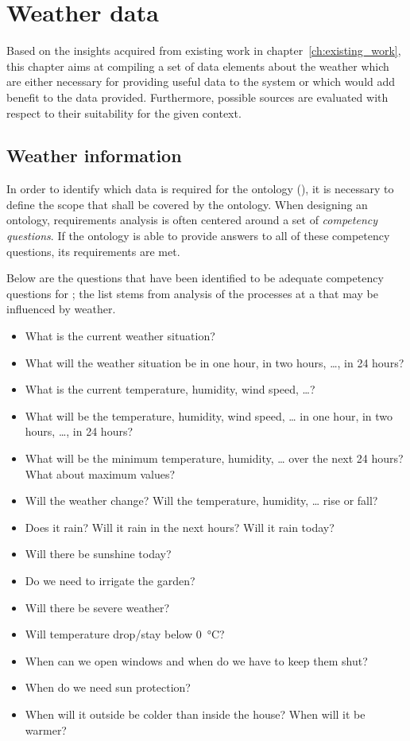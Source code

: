 \chapter{Weather data}
\label{ch:weather_data}

Based on the insights acquired from existing work in chapter~\ref{ch:existing_work}, this chapter aims at compiling a set of data elements about the weather which are either necessary for providing useful data to the \thinkhome system or which would add benefit to the data provided. Furthermore, possible sources are evaluated with respect to their suitability for the given context.

\section{Weather information}
\label{sec:weather_information}

In order to identify which data is required for the \thinkhome ontology (\thinkhomeweather), it is necessary to define the scope that shall be covered by the ontology. When designing an ontology, requirements analysis is often centered around a set of \emph{competency questions}\cite{Ontology101,UscholdKing,GruningerFox,Methontology}. If the ontology is able to provide answers to all of these competency questions, its requirements are met.

Below are the questions that have been identified to be adequate competency questions for \thinkhomeweather; the list stems from analysis of the processes at a \smarthome that may be influenced by weather.

\begin{itemize}
  \item What is the current weather situation?
  \item What will the weather situation be in one hour, in two hours, …, in 24 hours?
  \item What is the current temperature, humidity, wind speed, …?
  \item What will be the temperature, humidity, wind speed, … in one hour, in two hours, …, in 24 hours?
  \item What will be the minimum temperature, humidity, … over the next 24 hours? What about maximum values?
  \item Will the weather change? Will the temperature, humidity, … rise or fall?
  \item Does it rain? Will it rain in the next hours? Will it rain today?
  \item Will there be sunshine today? 
  \item Do we need to irrigate the garden?
  \item Will there be severe weather?
  \item Will temperature drop/stay below \SI{0}{\celsius}?
  \item When can we open windows and when do we have to keep them shut?
  \item When do we need sun protection?
  \item When will it outside be colder than inside the house? When will it be warmer?
\end{itemize}

